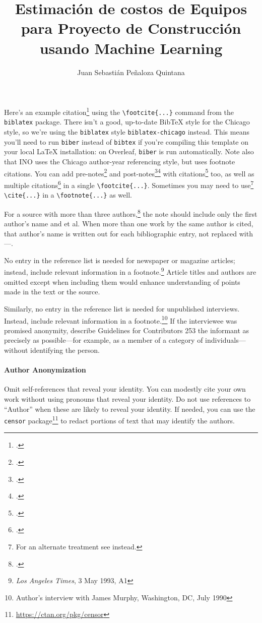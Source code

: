 \documentclass{cup-ino}
\title{Estimación de costos de Equipos para Proyecto de Construcción usando Machine Learning}
\author{Juan Sebastián Peñaloza Quintana}
\begin{document}
\maketitle

\begin{abstract}
\blindtext
\end{abstract}

\noindent Here's an example citation\footcite{ries:sweeney} using the \verb|\footcite{...}| command from the \texttt{biblatex} package. There isn't a good, up-to-date BibTeX style for the Chicago style, so we're using the \texttt{biblatex} style \texttt{biblatex-chicago} instead. This means you'll need to run \texttt{biber} instead of \texttt{bibtex} if you're compiling this template on your local \LaTeX{} installation: on Overleaf, \texttt{biber} is run automatically. Note also that INO uses the Chicago author-year referencing style, but uses footnote citations. You can add pre-notes\footcite[See also][]{risse:2000} and post-notes\footcite[52]{checkel:1997}\footcite[119]{grieco:1993} with citations\footcite{simmons:2001} too, as well as multiple citations\footcite{elliot:1994,kilroy:1995,pauwelyn:2015,mastanduno:1996} in a single \verb|\footcite{...}|. Sometimes you may need to use\footnote{For an alternate treatment see \cite{ussenate:chemwarfare:1984} instead.} \verb|\cite{...}| in a \verb|\footnote{...}| as well. 

For a source with more than three authors,\footcite{inman:etal:2013} the note should include only the first author's name and et al. When more than one work by the same author is cited, that author's name is written out for each bibliographic entry, not replaced with ---.

No entry in the reference list is needed for newspaper or magazine articles; instead, include relevant information in a footnote.\footnote{\emph{Los Angeles Times}, 3 May 1993, A1} Article titles and authors are omitted except when including them would enhance understanding of points made in the text or the source.

Similarly, no entry in the reference list is needed for unpublished interviews. Instead, include relevant information in a footnote.\footnote{Author's interview with James Murphy, Washington, DC, July 1990} If the interviewee was promised anonymity, describe Guidelines for Contributors 253 the informant as precisely as possible---for example, as a member of a category of individuals---without identifying the person.

\paragraph{Author Anonymization}
Omit self-references that reveal your identity. You can modestly cite your own work without using pronouns that reveal your identity. Do not use references to ``Author'' when these are likely to reveal your identity. If needed, you can use the \texttt{censor} package\footnote{\url{https://ctan.org/pkg/censor}} to redact portions of text that may identify the authors.
\end{document}
